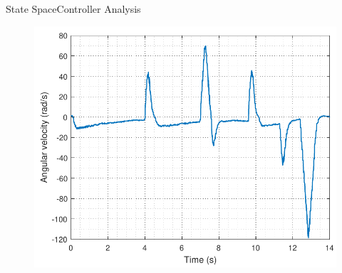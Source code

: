 \begin{frame}{State Space}{Controller Analysis}
\begin{minipage}{\linewidth}
\begin{minipage}{0.45\linewidth}
   	\end{minipage}
   	\hspace{0.03\linewidth}
   	\begin{minipage}{0.45\linewidth}
   		\begin{figure}[H]
   			\includegraphics[scale=.35]{Pictures/wheelSSTest}
   			\centering
   		\end{figure}
   	\end{minipage}
  \end{minipage}
\end{frame}



